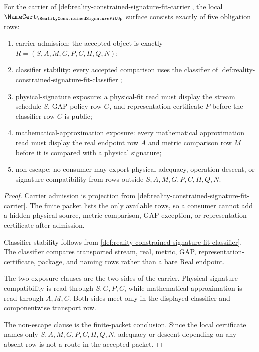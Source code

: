 \begin{theorem}
\label{thm:reality-constrained-signature-fit-namecert-obligations}
For the carrier of \autoref{def:reality-constrained-signature-fit-carrier}, the local $\NameCert_{\RealityConstrainedSignatureFitUp}$ surface consists exactly of five obligation rows:
\begin{enumerate}
\item carrier admission: the accepted object is exactly $R=(S,A,M,G,P,C,H,Q,N)$;
\item classifier stability: every accepted comparison uses the classifier of \autoref{def:reality-constrained-signature-fit-classifier};
\item physical-signature exposure: a physical-fit read must display the stream schedule $S$, GAP-policy row $G$, and representation certificate $P$ before the classifier row $C$ is public;
\item mathematical-approximation exposure: every mathematical approximation read must display the real endpoint row $A$ and metric comparison row $M$ before it is compared with a physical signature;
\item non-escape: no consumer may export physical adequacy, operation descent, or signature compatibility from rows outside $S,A,M,G,P,C,H,Q,N$.
\end{enumerate}
\end{theorem}
\begin{proof}
Carrier admission is projection from \autoref{def:reality-constrained-signature-fit-carrier}. The finite packet lists the only available rows, so a consumer cannot add a hidden physical source, metric comparison, GAP exception, or representation certificate after admission.

Classifier stability follows from \autoref{def:reality-constrained-signature-fit-classifier}. The classifier compares transported stream, real, metric, GAP, representation-certificate, package, and naming rows rather than a bare Real endpoint.

The two exposure clauses are the two sides of the carrier. Physical-signature compatibility is read through $S,G,P,C$, while mathematical approximation is read through $A,M,C$. Both sides meet only in the displayed classifier and componentwise transport row.

The non-escape clause is the finite-packet conclusion. Since the local certificate names only $S,A,M,G,P,C,H,Q,N$, adequacy or descent depending on any absent row is not a route in the accepted packet.
\end{proof}


